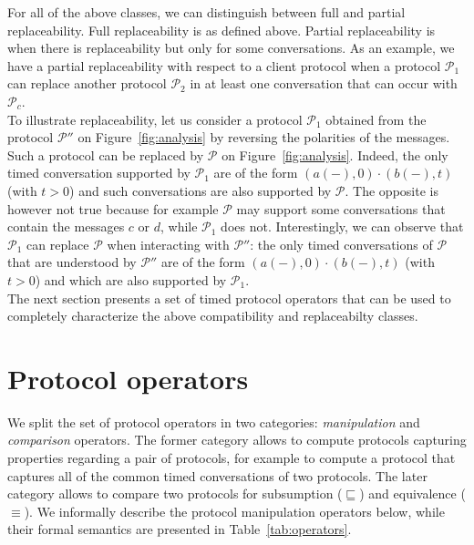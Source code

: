 For all of the above classes, we can distinguish between full and partial replaceability. Full replaceability is as defined above. Partial replaceability is when there is replaceability but only for some conversations. As an example, we have a partial replaceability with respect to a client protocol when a protocol $\mathcal{P}_1$ can replace another protocol $\mathcal{P}_2$ in at least one conversation that can occur with $\mathcal{P}_c$.\\

To illustrate replaceability, let us consider a protocol $\mathcal{P}_1$ obtained from the protocol $\mathcal{P''}$ on Figure~\ref{fig:analysis} by reversing the polarities of the messages. Such a protocol can be replaced by $\mathcal{P}$ on Figure~\ref{fig:analysis}. Indeed, the only timed conversation supported by  $\mathcal{P}_1$ are of the form $(a(-), 0) \cdot (b(-), t)$ (with $t > 0$) and such  conversations are also supported by  $\mathcal{P}$. The opposite is however not true because for example $\mathcal{P}$ may support some conversations that contain the messages $c$ or $d$, while $\mathcal{P}_1$ does not. Interestingly, we can observe that $\mathcal{P}_1$  can replace $\mathcal{P}$ when interacting with $\mathcal{P''}$: the only timed conversations of $\mathcal{P}$ that are understood by $\mathcal{P''}$ are of the form $(a(-), 0) \cdot (b(-), t)$ (with $t > 0$) and which are also supported by $\mathcal{P}_1$.\\

The next section presents a set of timed protocol operators that can be used to completely characterize the above compatibility and replaceabilty classes.


\section{Protocol operators}


We split the set of protocol operators in two categories: \emph{manipulation} and \emph{comparison} operators. The former category allows to compute protocols capturing properties regarding a pair of protocols, for example to compute a protocol that captures all of the common timed conversations of two protocols. The later category allows to compare two protocols for subsumption ($\sqsubseteq$) and equivalence ($\equiv$). We informally describe the protocol manipulation operators below, while their formal semantics are presented in Table~\ref{tab:operators}.

